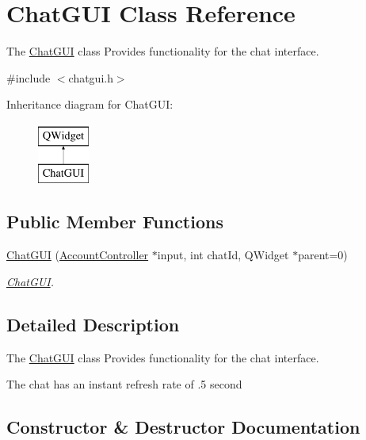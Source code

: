 \hypertarget{classChatGUI}{}\section{Chat\+G\+UI Class Reference}
\label{classChatGUI}


The \hyperlink{classChatGUI}{Chat\+G\+UI} class Provides functionality for the chat interface.  




{\ttfamily \#include $<$chatgui.\+h$>$}

Inheritance diagram for Chat\+G\+UI\+:\begin{figure}[H]
\begin{center}
\leavevmode
\includegraphics[height=2.000000cm]{classChatGUI}
\end{center}
\end{figure}
\subsection*{Public Member Functions}
\begin{DoxyCompactItemize}
\item 
\hyperlink{classChatGUI_acf2344f2c207af1cfeb643a17b925be5}{Chat\+G\+UI} (\hyperlink{classAccountController}{Account\+Controller} $\ast$input, int chat\+Id, Q\+Widget $\ast$parent=0)
\begin{DoxyCompactList}\small\item\em \hyperlink{classChatGUI}{Chat\+G\+UI}. \end{DoxyCompactList}\end{DoxyCompactItemize}


\subsection{Detailed Description}
The \hyperlink{classChatGUI}{Chat\+G\+UI} class Provides functionality for the chat interface. 

The chat has an instant refresh rate of .5 second 

\subsection{Constructor \& Destructor Documentation}
